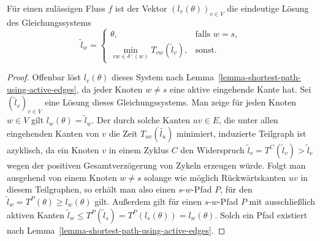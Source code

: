 \begin{proposition}\label{prop-arrival-times-vector}
	Für einen zulässigen Fluss $f$ ist der Vektor $(l_v(\theta))_{v\in V}$ die eindeutige Lösung des Gleichungssystems
	$$ \tilde{l}_w = \begin{cases}
	\theta, & \text{falls } w=s, \\
	\min\limits_{vw\in \delta^-(w)} T_{vw}(\tilde{l}_v), & \text{sonst}.
	\end{cases}$$
\end{proposition}
\begin{proof}
	Offenbar löst $l_v(\theta)$ dieses System nach Lemma~\ref{lemma-shortest-path-using-active-edges}, da jeder Knoten $w\neq s$ eine aktive eingehende Kante hat.
	Sei $(\tilde{l}_v)_{v\in V}$ eine Lösung dieses Gleichungssystems.
	Man zeige für jeden Knoten $w\in V$ gilt $l_w(\theta) = \tilde{l}_w$.
	Der durch solche Kanten $uv\in E$, die unter allen eingehenden Kanten von $v$ die Zeit $T_{uv}(\tilde{l_u})$ minimiert, induzierte Teilgraph ist azyklisch,
	da ein Knoten $v$ in einem Zyklus $C$ den Widerspruch $\tilde{l}_v = T^C(\tilde{l}_v) > \tilde{l}_v$ wegen der positiven Gesamtverzögerung von Zykeln erzeugen würde.
	Folgt man ausgehend von einem Knoten $w\neq s$ solange wie möglich Rückwärtskanten $uv$ in diesem Teilgraphen, so erhält man also einen $s$-$w$-Pfad $P$, für den $\tilde{l}_w = T^P(\theta) \geq l_w(\theta)$ gilt.
	Außerdem gilt für einen $s$-$w$-Pfad $P$ mit ausschließlich aktiven Kanten $\tilde{l}_w \leq T^P(\tilde{l}_s) = T^P(l_s(\theta)) = l_w(\theta)$.
	Solch ein Pfad existiert nach Lemma~\ref{lemma-shortest-path-using-active-edges}.
\end{proof}
